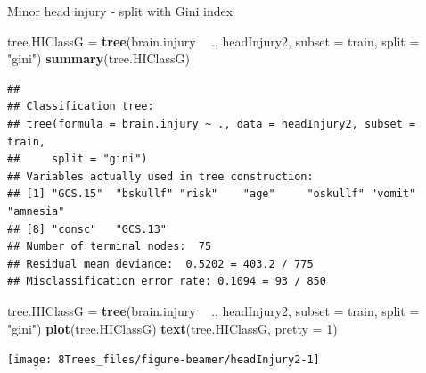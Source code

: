 \documentclass[10pt,ignorenonframetext,]{beamer}
\newenvironment{Shaded}{\begin{snugshade}}{\end{snugshade}}
\newcommand{\KeywordTok}[1]{\textcolor[rgb]{0.13,0.29,0.53}{\textbf{#1}}}
\newcommand{\DataTypeTok}[1]{\textcolor[rgb]{0.13,0.29,0.53}{#1}}
\newcommand{\DecValTok}[1]{\textcolor[rgb]{0.00,0.00,0.81}{#1}}
\newcommand{\StringTok}[1]{\textcolor[rgb]{0.31,0.60,0.02}{#1}}
\newcommand{\OperatorTok}[1]{\textcolor[rgb]{0.81,0.36,0.00}{\textbf{#1}}}
\newcommand{\NormalTok}[1]{#1}
\begin{document}
\begin{frame}[fragile]

\begin{block}{Minor head injury - split with Gini index}

\footnotesize

\begin{Shaded}
\begin{Highlighting}[]
\NormalTok{tree.HIClassG =}\StringTok{ }\KeywordTok{tree}\NormalTok{(brain.injury }\OperatorTok{~}\StringTok{ }\NormalTok{., headInjury2, }\DataTypeTok{subset =}\NormalTok{ train, }
    \DataTypeTok{split =} \StringTok{"gini"}\NormalTok{)}
\KeywordTok{summary}\NormalTok{(tree.HIClassG)}
\end{Highlighting}
\end{Shaded}

\begin{verbatim}
## 
## Classification tree:
## tree(formula = brain.injury ~ ., data = headInjury2, subset = train, 
##     split = "gini")
## Variables actually used in tree construction:
## [1] "GCS.15"  "bskullf" "risk"    "age"     "oskullf" "vomit"   "amnesia"
## [8] "consc"   "GCS.13" 
## Number of terminal nodes:  75 
## Residual mean deviance:  0.5202 = 403.2 / 775 
## Misclassification error rate: 0.1094 = 93 / 850
\end{verbatim}

\normalsize

\end{block}

\end{frame}

\begin{frame}[fragile]

\footnotesize

\begin{Shaded}
\begin{Highlighting}[]
\NormalTok{tree.HIClassG =}\StringTok{ }\KeywordTok{tree}\NormalTok{(brain.injury }\OperatorTok{~}\StringTok{ }\NormalTok{., headInjury2, }\DataTypeTok{subset =}\NormalTok{ train, }
    \DataTypeTok{split =} \StringTok{"gini"}\NormalTok{)}
\KeywordTok{plot}\NormalTok{(tree.HIClassG)}
\KeywordTok{text}\NormalTok{(tree.HIClassG, }\DataTypeTok{pretty =} \DecValTok{1}\NormalTok{)}
\end{Highlighting}
\end{Shaded}

\begin{center}\texttt{[image: 8Trees\_files/figure-beamer/headInjury2-1]} \end{center}

\end{frame}
\end{document}
